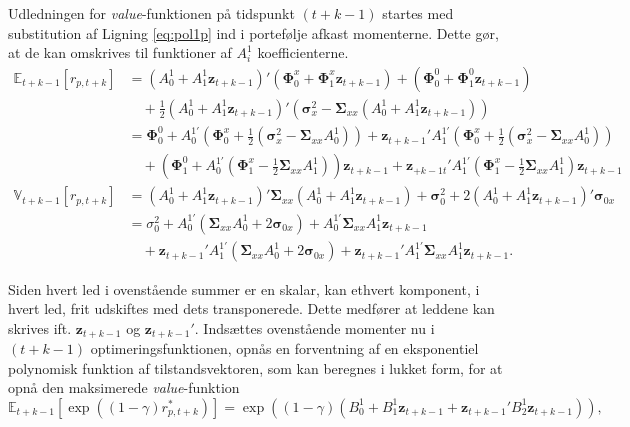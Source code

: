 \documentclass[
  a4paper,
  oneside]{memoir}
\begin{document}
Udledningen for \emph{value}-funktionen på tidspunkt \((t+k-1)\) startes med substitution af Ligning \eqref{eq:pol1p} ind i portefølje afkast momenterne. Dette gør, at de kan omskrives til funktioner af \(A_i^1\) koefficienterne.
\begin{align*}
\mathbb{E}_{t+k-1}[r_{p,t+k}] &= \left(A_0^1 + A_1^1\bm{z}_{t+k-1}\right)' \left(\bm{\Phi}_0^x +\bm{\Phi}_1^x\bm{z}_{t+k-1}\right) + \left(\bm{\Phi}_0^0 +\bm{\Phi}_1^0 \bm{z}_{t+k-1}\right)\\
&\quad+\frac{1}{2} \left(A_0^1 + A_1^1\bm{z}_{t+k-1}\right)' \left(\bm{\sigma}_x^2-\bm{\Sigma}_{xx}\left(A_0^1 + A_1^1\bm{z}_{t+k-1}\right)\right)\\
&=\bm{\Phi}_0^0+ A_0^{1\prime} \left(\bm{\Phi}_0^x + \frac{1}{2} \left(\bm{\sigma}_x^2 - \bm{\Sigma}_{xx} A_0^1\right)\right) + \bm{z}_{t+k-1}' A_1^{1\prime} \left(\bm{\Phi}_0^x + \frac{1}{2} \left(\bm{\sigma}_x^2  - \bm{\Sigma}_{xx} A_0^1\right)\right)\\
&\quad+ \left(\bm{\Phi}_1^0 + A_0^{1\prime} \left(\bm{\Phi}_1^x - \frac{1}{2} \bm{\Sigma}_{xx} A_1^1\right)\right) \bm{z}_{t+k-1} +\bm{z}_{+k-1t}' A_1^{1\prime} \left(\bm{\Phi}_1^x - \frac{1}{2} \bm{\Sigma}_{xx} A_1^1\right) \bm{z}_{t+k-1}\\
\mathbb{V}_{t+k-1}[r_{p,t+k}]&=\left(A_0^1 + A_1^1\bm{z}_{t+k-1}\right)'\bm{\Sigma}_{xx}\left(A_0^1 + A_1^1\bm{z}_{t+k-1}\right)+ \bm{\sigma}_0^2 + 2\left(A_0^1 + A_1^1\bm{z}_{t+k-1}\right)'\bm{\sigma}_{0x}\\
&=\sigma_0^2 + A_0^{1\prime} \left(\bm{\Sigma}_{xx} A_0^1 + 2\bm{\sigma}_{0x}\right) + A_0^{1\prime}\bm{\Sigma}_{xx}A_1^1 \bm{z}_{t+k-1}\\
&\quad+\bm{z}_{t+k-1}' A_1^{1\prime} \left(\bm{\Sigma}_{xx} A_0^1 + 2\bm{\sigma}_{0x}\right) + \bm{z}_{t+k-1}' A_1^{1\prime} \bm{\Sigma}_{xx} A_1^1 \bm{z}_{t+k-1}.
\end{align*}

Siden hvert led i ovenstående summer er en skalar, kan ethvert komponent, i hvert led, frit udskiftes med dets transponerede. Dette medfører at leddene kan skrives ift. \(\bm{z}_{t+k-1}\) og \(\bm{z}_{t+k-1}'\). Indsættes ovenstående momenter nu i \((t+k-1)\) optimeringsfunktionen, opnås en forventning af en eksponentiel polynomisk funktion af tilstandsvektoren, som kan beregnes i lukket form, for at opnå den maksimerede \emph{value}-funktion
\[\mathbb{E}_{t+k-1}\left[\exp((1-\gamma)r_{p,t+k}^*)\right] = \exp\left((1-\gamma) (B_0^1 + B_1^1 \bm{z}_{t+k-1}+\bm{z}_{t+k-1}'B_2^1 \bm{z}_{t+k-1})\right),\]
\end{document}
